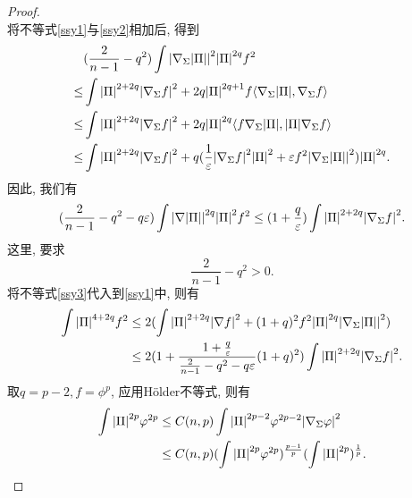 \begin{proof}
\begin{equation}
    \end{equation}
    将不等式\eqref{ssy1}与\eqref{ssy2}相加后, 得到
    \begin{equation}
        \begin{split}
            &(\frac{2}{n-1}-q^2)\int{\left | \nabla_\Sigma {\left | {\Pi}\right |} \right |}^{2} {\left | {\Pi} \right |}^{2q} f^2 \\
            \le & \int {\left | {\Pi}\right |}^{2+2q}{\left | \nabla_\Sigma f \right |}^2+2q{\left | {\Pi} \right |}^{2q+1}f{\left < \nabla_\Sigma {\left | {\Pi}\right |}, \nabla_\Sigma f \right >} \\
            \le & \int {\left | {\Pi}\right |}^{2+2q}{\left | \nabla_\Sigma f \right |}^2+2q{\left | {\Pi} \right |}^{2q}{\left < f\nabla_\Sigma {\left | {\Pi}\right |}, {\left | {\Pi} \right |}\nabla_\Sigma f \right >} \\
            \le& \int {\left | {\Pi}\right |}^{2+2q}{\left | \nabla_\Sigma f \right |}^2 + q(\frac{1}{\varepsilon} {\left | \nabla_\Sigma f \right |}^2{\left | {\Pi} \right |}^2 + \varepsilon f^2 {\left | \nabla_\Sigma {\left | {\Pi}\right |} \right |}^2){\left | {\Pi} \right |}^{2q}. 
        \end{split}
    \end{equation}
    因此, 我们有
    \begin{equation} \label{ssy3}
        (\frac{2}{n-1}-q^2-q\varepsilon) \int {\left | \nabla {\left | {\Pi}\right |} \right |}^{2q} {\left | {\Pi} \right |}^2 f^2 \le (1+\frac{q}{\varepsilon})\int {\left | {\Pi}\right |}^{2+2q}{\left | \nabla_\Sigma f \right |}^2.
    \end{equation}
    这里, 要求
    \begin{equation}
        \frac{2}{n-1}-q^2 >0.
    \end{equation}
    将不等式\eqref{ssy3}代入到\eqref{ssy1}中, 则有
    \begin{equation}
        \begin{split}
            \int {\left | {\Pi}\right |}^{4+2q}f^2 &\le 2(\int {\left | {\Pi}\right |}^{2+2q}{\left | \nabla f \right |}^2 + (1+q)^2f^2{\left | {\Pi} \right |}^{2q}{\left | \nabla_\Sigma {\left | {\Pi}\right |} \right |}^2) \\
            & \le 2(1+\frac{1+\frac{q}{\varepsilon}}{\frac{2}{n-1}-q^2-q\varepsilon}(1+q)^2)\int {\left | {\Pi}\right |}^{2+2q}{\left | \nabla_\Sigma f \right |}^2.
        \end{split}
    \end{equation}
    取$q=p-2, f=\phi^p$, 应用H\"older不等式, 则有
    \begin{equation}
        \begin{split}
            \int {\left | {\Pi}\right |}^{2p} {\varphi}^{2p} &\le C(n,p)\int {\left | {\Pi}\right |}^{2p-2}{\varphi}^{2p-2}{\left | \nabla_{\Sigma}{\varphi} \right |}^2 \\
            & \le C(n,p)(\int{\left | {\Pi}\right |}^{2p}{\varphi}^{2p})^\frac{p-1}{p}(\int{\left | {\Pi}\right |}^{2p})^{\frac{1}{p}}.
        \end{split}
    \end{equation}
\end{proof}
